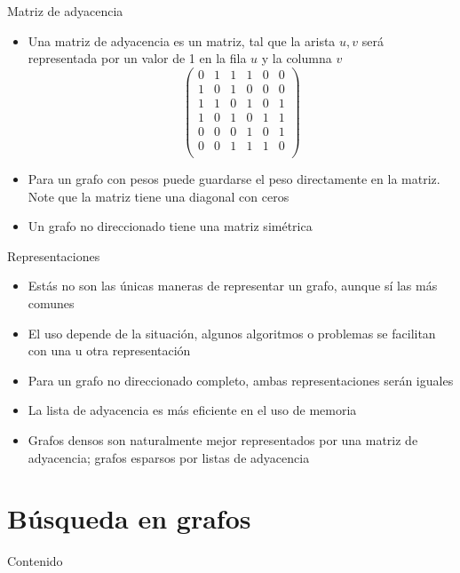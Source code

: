 \documentclass[]{beamer}
\begin{document}
\begin{frame}{Matriz de adyacencia}
  \begin{itemize}
    \item Una matriz de adyacencia es un matriz, tal que la arista $u,v$ ser\'a representada por un valor de 1 en la fila $u$ y la columna $v$
      \pause
\[
\begin{pmatrix}
  0 & 1 & 1 & 1 & 0 & 0 \\
  1 & 0 & 1 & 0 & 0 & 0 \\
  1 & 1 & 0 & 1 & 0 & 1 \\
  1 & 0 & 1 & 0 & 1 & 1 \\
  0 & 0 & 0 & 1 & 0 & 1 \\
  0 & 0 & 1 & 1 & 1 & 0 \\
\end{pmatrix}
\]
    \pause
    \item Para un grafo con pesos puede guardarse el peso directamente en la matriz. Note que la matriz tiene una diagonal con ceros
      \pause
    \item Un grafo no direccionado tiene una matriz sim\'etrica
  \end{itemize}
\end{frame}

\begin{frame}{Representaciones}
  \begin{itemize}
    \item Est\'as no son las \'unicas maneras de representar un grafo, aunque s\'i las m\'as comunes
      \pause
    \item El uso depende de la situaci\'on, algunos algoritmos o problemas se facilitan con una u otra representaci\'on
      \pause
    \item Para un grafo no direccionado completo, ambas representaciones ser\'an iguales
      \pause
    \item La lista de adyacencia es m\'as eficiente en el uso de memoria
      \pause
    \item Grafos densos son naturalmente mejor representados por una matriz de adyacencia; grafos esparsos por listas de adyacencia
  \end{itemize}
\end{frame}

\section{B\'usqueda en grafos}
\begin{frame}{Contenido}
\tableofcontents[currentsection]
\end{frame}
\end{document}
